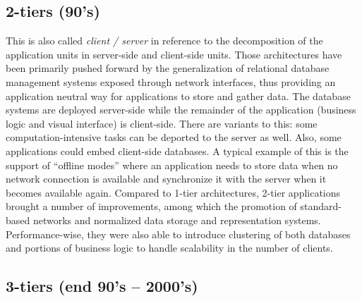 
\subsection{2-tiers (90's)}


This is also called \emph{client / server} in reference to the decomposition of the application units in server-side and client-side units. Those architectures have been primarily pushed forward by the generalization of relational database management systems exposed through network interfaces, thus providing an application neutral way for applications to store and gather data. The database systems are deployed server-side while the remainder of the application (business logic and visual interface) is client-side. There are variants to this: some computation-intensive tasks can be deported to the server as well. Also, some applications could embed client-side databases. A typical example of this is the support of ``offline modes'' where an application needs to store data when no network connection is available and synchronize it with the server when it becomes available again. Compared to 1-tier architectures, 2-tier applications brought a number of improvements, among which the promotion of standard-based networks and normalized data storage and representation systems. Performance-wise, they were also able to introduce clustering of both databases and portions of business logic to handle scalability in the number of clients.\\


\subsection{3-tiers (end 90's -- 2000's)}



